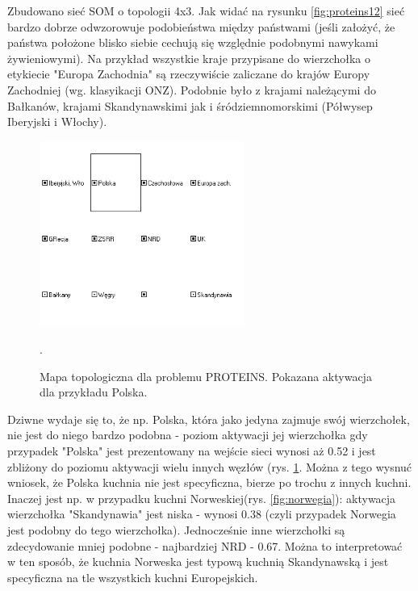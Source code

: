 Zbudowano sieć SOM o topologii 4x3. Jak widać na rysunku \ref{fig:proteins12} sieć bardzo dobrze odwzorowuje podobieństwa między państwami (jeśli założyć, że państwa położone blisko siebie cechują się względnie podobnymi nawykami żywieniowymi). Na przykład wszystkie kraje przypisane do wierzchołka o etykiecie "Europa Zachodnia" są rzeczywiście zaliczane do krajów Europy Zachodniej (wg. klasyikacji ONZ). Podobnie było z krajami należącymi do Bałkanów, krajami Skandynawskimi jak i śródziemnomorskimi (Półwysep Iberyjski i Włochy).

\begin{figure}[h]
\begin{centering}
\includegraphics[width=0.6\textwidth]{dane/part3/zad2/polska}
\caption{Mapa topologiczna dla problemu PROTEINS. Pokazana aktywacja dla przykładu Polska.\label{fig:polska}}.
\end{centering}
\end{figure}

Dziwne wydaje się to, że np. Polska, która jako jedyna zajmuje swój wierzchołek, nie jest do niego bardzo podobna - poziom aktywacji jej wierzchołka gdy przypadek "Polska" jest prezentowany na wejście sieci wynosi aż 0.52 i jest zbliżony do poziomu aktywacji wielu innych węzłów (rys. \ref{fig:polska}. Można z tego wysnuć wniosek, że Polska kuchnia nie jest specyficzna, bierze po trochu z innych kuchni.
Inaczej jest np. w przypadku kuchni Norweskiej(rys. \ref{fig:norwegia}):  aktywacja wierzchołka "Skandynawia" jest niska - wynosi 0.38 (czyli przypadek Norwegia jest podobny do tego wierzchołka). Jednocześnie inne wierzchołki są zdecydowanie mniej podobne - najbardziej NRD - 0.67. Można to interpretować w ten sposób, że kuchnia Norweska jest typową kuchnią Skandynawską i jest specyficzna na tle wszystkich kuchni Europejskich.


